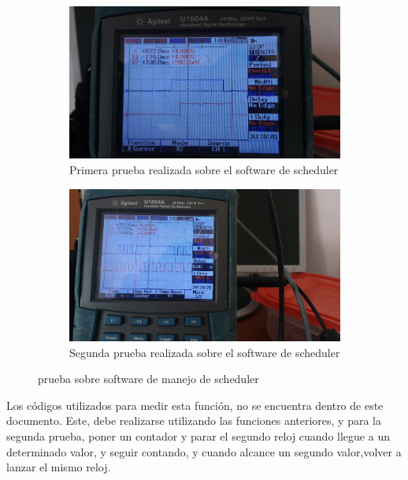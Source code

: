 \begin{figure}[ht]
	\begin{subfigure}{0.5\linewidth}
		\centering
		\includegraphics[width=\linewidth]{osciloscopio_im1} 
		\caption{Primera prueba realizada sobre el software de scheduler}
		\label{fig:osc_m1}	
	\end{subfigure}
	\hfill
	\begin{subfigure}{0.5\linewidth}
		\centering
		\includegraphics[width=\linewidth]{osciloscopio_im2}
		\caption{Segunda prueba realizada sobre el software de scheduler} 
		\label{fig:osc_m2}		
	\end{subfigure}
	\caption{prueba sobre software de manejo de scheduler}
\end{figure}

Los códigos utilizados para medir esta función, no se encuentra dentro de este documento. Este, debe realizarse utilizando las funciones anteriores, y para la segunda prueba, poner un contador y parar el segundo reloj cuando llegue a un determinado valor, y seguir contando, y cuando alcance un segundo valor,volver a lanzar el mismo reloj. 

